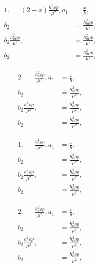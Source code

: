 		
		\vspace{10 mm}
		
		\begin{minipage}[t]{0.5\textwidth}
			\begin{align*}
			1.\hspace{20pt}(2-x)\frac{h_0^2 \rho p}{\mu^2},a_1 &= \frac{x}{h},\\ 
			b_2 &= \frac{h_0^2 \rho p}{\mu^2},\\
			b_2\frac{h_0^2 \rho p}{\mu^2}, &= \frac{h_0^2 \rho p}{\mu^2},\\
			b_2 &= \frac{h_0^2 \rho p}{\mu^2},
			\end{align*}
		\end{minipage}
		\begin{minipage}[t]{0.5\textwidth}
			\begin{align*}
			2.\hspace{20pt}\frac{h_0^2 \rho p}{\mu^2},a_1 &= \frac{x}{h},\\ 
			b_2 &= \frac{h_0^2 \rho p}{\mu^2},\\
			b_2\frac{h_0^2 \rho p}{\mu^2}, &= \frac{h_0^2 \rho p}{\mu^2},\\
			b_2 &= \frac{h_0^2 \rho p}{\mu^2},
			\end{align*}
		\end{minipage}
		
		
		\vspace{10 mm}
		
		\begin{minipage}[t]{0.5\textwidth}
			\begin{align*}
			1.\hspace{20pt}\frac{h_0^2 \rho p}{\mu^2},a_1 &= \frac{x}{h},\\ 
			b_2 &= \frac{h_0^2 \rho p}{\mu^2},\\
			b_2\frac{h_0^2 \rho p}{\mu^2}, &= \frac{h_0^2 \rho p}{\mu^2},\\
			b_2 &= \frac{h_0^2 \rho p}{\mu^2},
			\end{align*}
		\end{minipage}
		\begin{minipage}[t]{0.5\textwidth}
			\begin{align*}
			2.\hspace{20pt}\frac{h_0^2 \rho p}{\mu^2},a_1 &= \frac{x}{h},\\ 
			b_2 &= \frac{h_0^2 \rho p}{\mu^2},\\
			b_2\frac{h_0^2 \rho p}{\mu^2}, &= \frac{h_0^2 \rho p}{\mu^2},\\
			b_2 &= \frac{h_0^2 \rho p}{\mu^2},
			\end{align*}
		\end{minipage}
		
